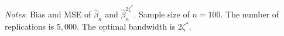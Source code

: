 \documentclass[12pt,fleqn]{article}
\theoremstyle{definition}
\newcommand{\wh}{\widehat}
\newcommand{\hROT}{\zeta^*}
\begin{document}
\begin{sidewaystable}[!htbp]
\begin{adjustbox}{scale=0.99,right}
\begin{threeparttable}
\begin{tablenotes}
\scriptsize
\item \textit{Notes}: Bias and MSE of $\wh{\beta}_{n}$ and $\wh{\beta}_{n}^{2\hROT}$. Sample size of $n=100$. The number of replications is $5,000$. The optimal bandwidth is $2\hROT$.
\end{tablenotes}
\end{threeparttable}
\end{adjustbox}
\end{sidewaystable}  
\end{document}
